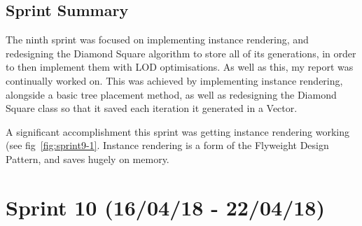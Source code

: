 \documentclass[a4paper,10pt]{report}
\begin{document}
\subsection{Sprint Summary}

The ninth sprint was focused on implementing instance rendering, and redesigning the Diamond Square algorithm to store all of its generations, in order to then implement them with LOD optimisations. As well as this, my report was continually worked on. This was achieved by implementing instance rendering, alongside a basic tree placement method, as well as redesigning the Diamond Square class so that it saved each iteration it generated in a Vector. \medskip

A significant accomplishment this sprint was getting instance rendering working (see fig~\ref{fig:sprint9-1}. Instance rendering is a form of the Flyweight Design Pattern, and saves hugely on memory.

\clearpage
\section{Sprint 10 (16/04/18 -  22/04/18)}
\end{document}

